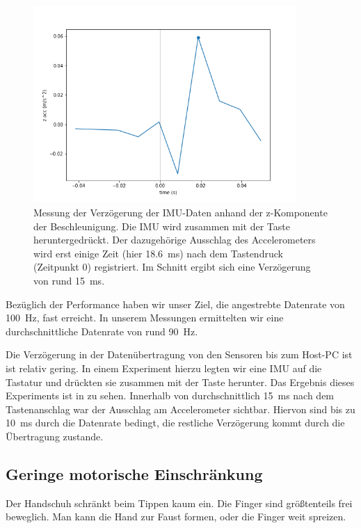 \begin{figure}
    \centering
    \includegraphics[width=10cm]{../common/images/delay}
    \caption[Messung der Verzögerung der IMU-Daten]{Messung der Verzögerung der IMU-Daten anhand der z-Komponente der
    Beschleunigung. Die IMU wird zusammen mit der Taste heruntergedrückt. Der
    dazugehörige Ausschlag des Accelerometers wird erst einige Zeit (hier
    \SI{18.6}{\milli\second}) nach dem Tastendruck (Zeitpunkt 0) registriert.
    Im Schnitt ergibt sich eine Verzögerung von rund \SI{15}{\milli\second}.}
\end{figure}

Bezüglich der Performance haben wir unser Ziel, die angestrebte Datenrate von
\SI{100}{Hz}, fast erreicht. In unserem Messungen ermittelten wir eine
durchschnittliche Datenrate von rund \SI{90}{Hz}.

Die Verzögerung in der Datenübertragung von den Sensoren bis zum Host-PC ist
ist relativ gering.  In einem Experiment hierzu legten wir eine IMU auf die
Tastatur und drückten sie zusammen mit der Taste herunter.  Das Ergebnis dieses
Experiments ist in  zu sehen. Innerhalb von
durchschnittlich \SI{15}{ms} nach dem Tastenanschlag war der Ausschlag am
Accelerometer sichtbar. Hiervon sind bis zu \SI{10}{ms} durch die Datenrate
bedingt, die restliche Verzögerung kommt durch die Übertragung zustande.

\subsection{Geringe motorische Einschränkung}

Der Handschuh schränkt beim Tippen kaum ein. Die Finger sind größtenteils frei
beweglich. Man kann die Hand zur Faust formen, oder die Finger weit spreizen.

